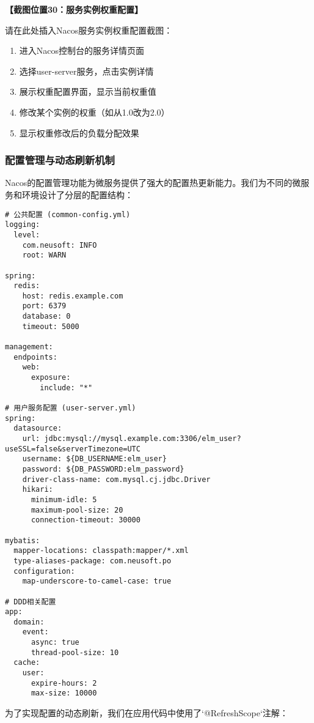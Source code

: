 \documentclass[a4paper,12pt]{article}
\begin{document}
\textbf{【截图位置30：服务实例权重配置】}

请在此处插入Nacos服务实例权重配置截图：
\begin{enumerate}
\item 进入Nacos控制台的服务详情页面
\item 选择user-server服务，点击实例详情
\item 展示权重配置界面，显示当前权重值
\item 修改某个实例的权重（如从1.0改为2.0）
\item 显示权重修改后的负载分配效果
\end{enumerate}

\subsubsection{配置管理与动态刷新机制}

Nacos的配置管理功能为微服务提供了强大的配置热更新能力。我们为不同的微服务和环境设计了分层的配置结构：

\begin{lstlisting}[caption=分层配置结构]
# 公共配置 (common-config.yml)
logging:
  level:
    com.neusoft: INFO
    root: WARN
    
spring:
  redis:
    host: redis.example.com
    port: 6379
    database: 0
    timeout: 5000
    
management:
  endpoints:
    web:
      exposure:
        include: "*"

# 用户服务配置 (user-server.yml)        
spring:
  datasource:
    url: jdbc:mysql://mysql.example.com:3306/elm_user?useSSL=false&serverTimezone=UTC
    username: ${DB_USERNAME:elm_user}
    password: ${DB_PASSWORD:elm_password}
    driver-class-name: com.mysql.cj.jdbc.Driver
    hikari:
      minimum-idle: 5
      maximum-pool-size: 20
      connection-timeout: 30000
      
mybatis:
  mapper-locations: classpath:mapper/*.xml
  type-aliases-package: com.neusoft.po
  configuration:
    map-underscore-to-camel-case: true
    
# DDD相关配置
app:
  domain:
    event:
      async: true
      thread-pool-size: 10
  cache:
    user:
      expire-hours: 2
      max-size: 10000
\end{lstlisting}

为了实现配置的动态刷新，我们在应用代码中使用了`@RefreshScope`注解：
\end{document}
